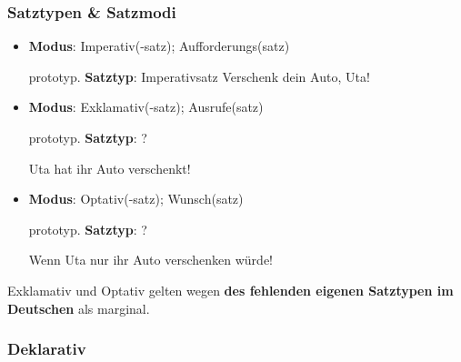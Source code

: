 \begin{frame}
\frametitle{Satztypen \& Satzmodi}


\begin{itemize}
	\item \textbf{Modus}: Imperativ(-satz); Aufforderungs(satz) 
	
	prototyp. \textbf{Satztyp}: Imperativsatz
	\ea Verschenk dein Auto, Uta!
	\z

\pause 
	
	\item \textbf{Modus}: Exklamativ(-satz); Ausrufe(satz)
	
	prototyp. \textbf{Satztyp}: ?
	
	\ea Uta hat ihr Auto verschenkt!
	\z

\pause 
	
	\item \textbf{Modus}: Optativ(-satz); Wunsch(satz)
	
	prototyp. \textbf{Satztyp}: ?
	
	\ea Wenn Uta nur ihr Auto verschenken würde!
	\z
	
\end{itemize}

Exklamativ und Optativ gelten wegen \textbf{des fehlenden eigenen Satztypen im Deutschen} als marginal.


\end{frame}


\subsubsection{Deklarativ}



